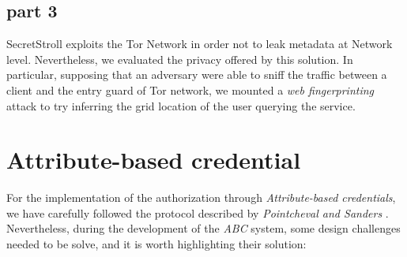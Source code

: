 \documentclass[10pt,conference,compsocconf]{IEEEtran}
\begin{document}
\subsection{part 3}
SecretStroll exploits the Tor Network in order not to leak metadata at Network level. Nevertheless, we
evaluated the privacy offered by this solution. In particular, supposing that an adversary were able to
sniff the traffic between a client and the entry guard of Tor network, we mounted a \textit{web fingerprinting}
attack to try inferring the grid location of the user querying the service.
\section{Attribute-based credential}
For the implementation of the authorization through \textit{Attribute-based
credentials}, we have carefully followed the protocol described by
\textit{Pointcheval and Sanders} \cite{PS_signature}. Nevertheless, during the
development of the \textit{ABC} system, some design challenges needed to be
solve, and it is worth highlighting their solution:
\end{document}
